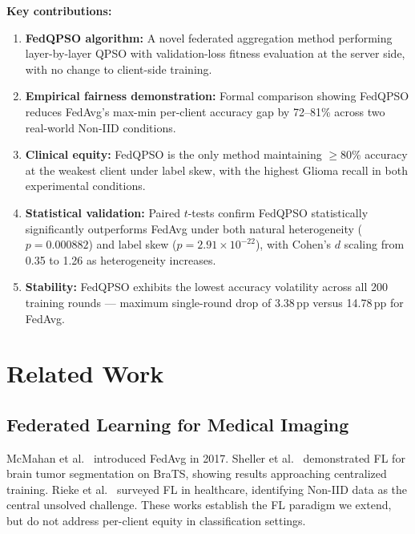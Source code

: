\documentclass[conference]{IEEEtran}
\begin{document}
\textbf{Key contributions:}
\begin{enumerate}
    \item \textbf{FedQPSO algorithm:} A novel federated aggregation method
    performing layer-by-layer QPSO with validation-loss fitness evaluation at
    the server side, with no change to client-side training.

    \item \textbf{Empirical fairness demonstration:} Formal comparison
    showing FedQPSO reduces FedAvg's max-min per-client accuracy gap by
    72--81\% across two real-world Non-IID conditions.

    \item \textbf{Clinical equity:} FedQPSO is the only method maintaining
    $\geq$80\% accuracy at the weakest client under label skew, with the
    highest Glioma recall in both experimental conditions.

    \item \textbf{Statistical validation:} Paired $t$-tests confirm FedQPSO
    statistically significantly outperforms FedAvg under both natural
    heterogeneity ($p = 0.000882$) and label skew ($p = 2.91\times10^{-22}$),
    with Cohen's $d$ scaling from 0.35 to 1.26 as heterogeneity increases.

    \item \textbf{Stability:} FedQPSO exhibits the lowest accuracy
    volatility across all 200 training rounds — maximum single-round drop
    of 3.38\,pp versus 14.78\,pp for FedAvg.
\end{enumerate}

\section{Related Work}
\label{sec:related}

\subsection{Federated Learning for Medical Imaging}
McMahan et al.\ \cite{mcmahan2017} introduced FedAvg in 2017. Sheller et al.\
\cite{sheller2018} demonstrated FL for brain tumor segmentation on BraTS,
showing results approaching centralized training. Rieke et al.\
\cite{rieke2020} surveyed FL in healthcare, identifying Non-IID data as the
central unsolved challenge. These works establish the FL paradigm we extend,
but do not address per-client equity in classification settings.
\end{document}
